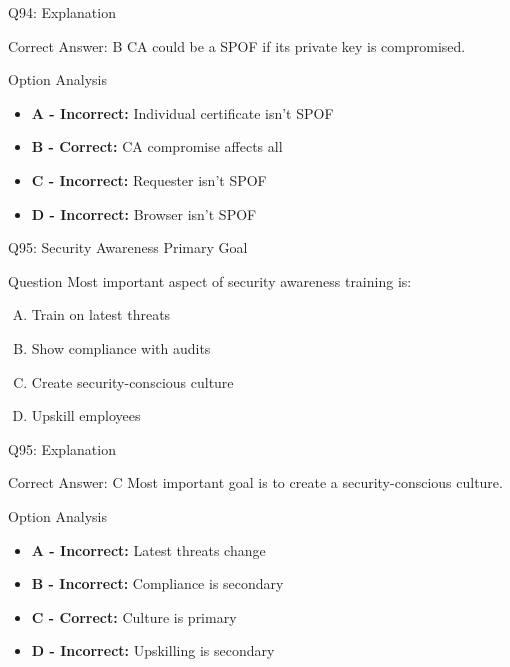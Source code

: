 \documentclass{beamer}
\begin{document}
	\begin{frame}{Q94: Explanation}
		\begin{block}{Correct Answer: B}
			CA could be a SPOF if its private key is compromised.
		\end{block}
		\begin{block}{Option Analysis}
			\begin{itemize}
				\item \textbf{A - Incorrect:} Individual certificate isn't SPOF
				\item \textbf{B - Correct:} CA compromise affects all
				\item \textbf{C - Incorrect:} Requester isn't SPOF
				\item \textbf{D - Incorrect:} Browser isn't SPOF
			\end{itemize}
		\end{block}
	\end{frame}
	
	\begin{frame}{Q95: Security Awareness Primary Goal}
		\begin{block}{Question}
			Most important aspect of security awareness training is:
		\end{block}
		\begin{enumerate}[(A)]
			\item Train on latest threats
			\item Show compliance with audits
			\item Create security-conscious culture
			\item Upskill employees
		\end{enumerate}
	\end{frame}
	
	\begin{frame}{Q95: Explanation}
		\begin{block}{Correct Answer: C}
			Most important goal is to create a security-conscious culture.
		\end{block}
		\begin{block}{Option Analysis}
			\begin{itemize}
				\item \textbf{A - Incorrect:} Latest threats change
				\item \textbf{B - Incorrect:} Compliance is secondary
				\item \textbf{C - Correct:} Culture is primary
				\item \textbf{D - Incorrect:} Upskilling is secondary
			\end{itemize}
		\end{block}
	\end{frame}
	
\end{document}
